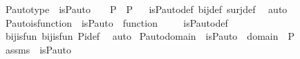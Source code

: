 \begin{isabellebody}
\isanewline
{}\isamarkupfalse%
\ P{\isacharunderscore}{\kern0pt}auto{\isacharunderscore}{\kern0pt}type\ {\isacharcolon}{\kern0pt}\ {\isachardoublequoteopen}is{\isacharunderscore}{\kern0pt}P{\isacharunderscore}{\kern0pt}auto{\isacharparenleft}{\kern0pt}{\isasympi}{\isacharparenright}{\kern0pt}\ {\isasymLongrightarrow}\ {\isasympi}\ {\isasymin}\ P\ {\isasymrightarrow}\ P{\isachardoublequoteclose}%
\isadelimproof
\ %
\endisadelimproof
%
\isatagproof
{}\isamarkupfalse%
\ is{\isacharunderscore}{\kern0pt}P{\isacharunderscore}{\kern0pt}auto{\isacharunderscore}{\kern0pt}def\ bij{\isacharunderscore}{\kern0pt}def\ surj{\isacharunderscore}{\kern0pt}def\ \isamarkupfalse%
\ auto%
\endisatagproof
{\isafoldproof}%
%
\isadelimproof
%
\endisadelimproof
\isanewline
\isanewline
{}\isamarkupfalse%
\ P{\isacharunderscore}{\kern0pt}auto{\isacharunderscore}{\kern0pt}is{\isacharunderscore}{\kern0pt}function\ {\isacharcolon}{\kern0pt}\ {\isachardoublequoteopen}is{\isacharunderscore}{\kern0pt}P{\isacharunderscore}{\kern0pt}auto{\isacharparenleft}{\kern0pt}{\isasympi}{\isacharparenright}{\kern0pt}\ {\isasymLongrightarrow}\ function{\isacharparenleft}{\kern0pt}{\isasympi}{\isacharparenright}{\kern0pt}{\isachardoublequoteclose}\ \isanewline
%
\isadelimproof
\ \ %
\endisadelimproof
%
\isatagproof
{}\isamarkupfalse%
\ is{\isacharunderscore}{\kern0pt}P{\isacharunderscore}{\kern0pt}auto{\isacharunderscore}{\kern0pt}def\ \isanewline
\ \ \isamarkupfalse%
\ bij{\isacharunderscore}{\kern0pt}is{\isacharunderscore}{\kern0pt}fun\ bij{\isacharunderscore}{\kern0pt}is{\isacharunderscore}{\kern0pt}fun\ Pi{\isacharunderscore}{\kern0pt}def\ \isamarkupfalse%
\ auto%
\endisatagproof
{\isafoldproof}%
%
\isadelimproof
\isanewline
%
\endisadelimproof
\isanewline
{}\isamarkupfalse%
\ P{\isacharunderscore}{\kern0pt}auto{\isacharunderscore}{\kern0pt}domain\ {\isacharcolon}{\kern0pt}\ {\isachardoublequoteopen}is{\isacharunderscore}{\kern0pt}P{\isacharunderscore}{\kern0pt}auto{\isacharparenleft}{\kern0pt}{\isasympi}{\isacharparenright}{\kern0pt}\ {\isasymLongrightarrow}\ domain{\isacharparenleft}{\kern0pt}{\isasympi}{\isacharparenright}{\kern0pt}\ {\isacharequal}{\kern0pt}\ P{\isachardoublequoteclose}\ \isanewline
%
\isadelimproof
%
\endisadelimproof
%
\isatagproof
{}\isamarkupfalse%
\ {\isacharminus}{\kern0pt}\ \isanewline
\ \ \isamarkupfalse%
\ assms\ {\isacharcolon}{\kern0pt}\ {\isachardoublequoteopen}is{\isacharunderscore}{\kern0pt}P{\isacharunderscore}{\kern0pt}auto{\isacharparenleft}{\kern0pt}{\isasympi}{\isacharparenright}{\kern0pt}{\isachardoublequoteclose}\ \isanewline

\end{isabellebody}
